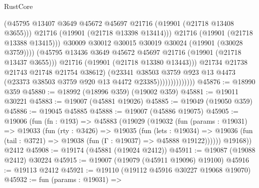 \begin{lexlean}{RustCore}
\begin{coremodule}
                                        (@45795
                                          @13407
                                          @3649
                                          @45672
                                          @45697
                                          @21716
                                          (@19901 (@21718 @13408 @3655)))
                                        @21716
                                        (@19901 (@21718 @13398 @13414)))
                                      @21716
                                      (@19901 (@21718 @13388 @13415)))
                                    @30009
                                    @30012
                                    @30015
                                    @30019
                                    @30024
                                    (@19901 (@30028 @3759))))
                                (@45795
                                  @13436
                                  @3649
                                  @45672
                                  @45697
                                  @21716
                                  (@19901 (@21718 @13437 @3655)))
                                @21716
                                (@19901 (@21718 @13380 @13443)))
                              @21734
                              @21738
                              @21743
                              @21748
                              @21754
                              @38612)
                            (@23341
                              @38503
                              @3759
                              @923
                              @13
                              @4473
                              (@23373 @38503 @3759 @920 @13 @4472 @23385))))))))))))))
@45876 := @18990 @359
@45880 := @18992 (@18996 @359) (@19002 @359)
@45881 := @19011 @30221
@45883 := @19007 (@45881 @19026)
@45885 := @19049 (@19050 @359)
@45886 := @19045 @45885
@45888 := @19007 (@45886 @19075)
@45905 := @19006
    (fun (fn : @193) =>
    @45883
      (@19029
        (@19032
          (fun (params : @19031) =>
          @19033
            (fun (rty : @3426) =>
            @19035
              (fun (lets : @19034) =>
              @19036 (fun (tail : @3721) => @19038 (fun (Γ : @19037) => @45888 @19122))))))
        @19168))
    @2412
@45908 := @19174 (@45881 (@19024 @2412))
@45911 := @19087 (@19088 @2412) @30224
@45915 := @19007 (@19079 (@45911 @19096) @19100)
@45916 := @19113 @2412
@45921 := @19110 (@19112 @45916 @30227 @19068 @19070)
@45932 := fun (params : @19031) =>

\end{coremodule}
\end{lexlean}
